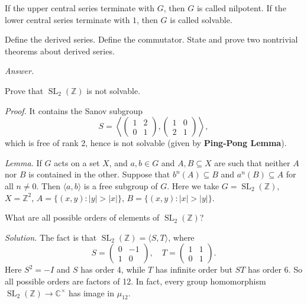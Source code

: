 \documentclass{mathproblems}
\newcommand\Z{\mathbb{Z}}
\begin{document}
\begin{questions}
If the upper central series terminate with $G$, then $G$ is called nilpotent. If the lower central series terminate with $1$, then $G$ is called solvable.


\miquestion
{\color{blue} Define the derived series. Define the commutator. State and prove two nontrivial theorems about derived series.}

\textit{Answer.}


\miquestion
{\color{blue} Prove that $\operatorname{SL}_2(\Z)$ is not solvable.}

\textit{Proof.} It contains the Sanov subgroup
$$
S=\left\langle \begin{pmatrix}1&2\\0&1\end{pmatrix},\begin{pmatrix}1&0\\2&1\end{pmatrix}\right\rangle,
$$
which is free of rank 2, hence is not solvable (given by {\color{violet}\textbf{Ping-Pong Lemma}}).

{\color{violet}
\textit{Lemma.} If $G$ acts on a set $X$, and $a, b \in G$ and $A, B \subseteq X$ are such that neither $A$ nor $B$ is contained in the other. Suppose that $b^{n}(A) \subseteq B$ and $a^{n}(B) \subseteq A$ for all $n\neq 0$. Then $\langle a,b \rangle$ is a free subgroup of $G$. Here we take $G=\operatorname{SL}_2(\Z)$, $X=\Z^2$, $A=\{(x,y):|y|>|x|\}$, $B=\{(x,y):|x|>|y|\}$.
}


\miquestion
{\color{blue} What are all possible orders of elements of $\operatorname{SL}_2(\Z)$?}

\textit{Solution.} The fact is that $\operatorname{SL}_2(\Z)=\langle S,T\rangle$, where
$$
S=\begin{pmatrix} 0 & -1 \\ 1 & 0\end{pmatrix},\quad T=\begin{pmatrix} 1 & 1 \\ 0 & 1\end{pmatrix}.
$$
Here $S^2=-I$ and $S$ has order 4, while $T$ has infinite order but $ST$ has order 6. So all possible orders are factors of 12. In fact, every group homomorphism $\operatorname{SL}_2(\Z)\to \mathbb{C}^\times$ has image in $\mu_{12}$.



\end{questions}
\end{document}
